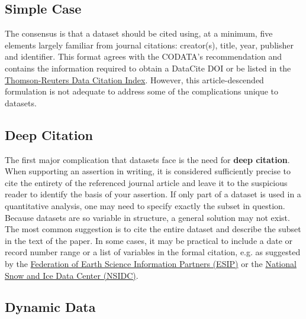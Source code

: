 \documentclass[10pt,twocolumn]{article}
\begin{document}
\subsection*{Simple Case}\label{simple-case}

The consensus is that a dataset should be cited using, at a minimum, five elements largely familiar from journal citations: creator(s), title, year, publisher and identifier.
This format agrees with the CODATA's recommendation\cite{codata-icsti_task_group_on_data_citation_standards_and_practices_out_2013} and contains the information required to obtain a DataCite DOI\cite{datacite_datacite_2013} or be listed in the \href{http://thomsonreuters.com/data-citation-index/}{Thomson-Reuters Data Citation Index}.
However, this article-descended formulation is not adequate to address some of the complications unique to datasets.

\subsection*{Deep Citation}\label{deep-citation}

The first major complication that datasets face is the need for \textbf{deep citation}.
When supporting an assertion in writing, it is considered sufficiently precise to cite the entirety of the referenced journal article and leave it to the suspicious reader to identify the basis of your assertion.
If only part of a dataset is used in a quantitative analysis, one may need to specify exactly the subset in question.
Because datasets are so variable in structure, a general solution may not exist.
The most common suggestion is to cite the entire dataset and describe the subset in the text of the paper.\cite{altman_a_2007,}
In some cases, it may be practical to include a date or record number range or a list of variables in the formal citation, e.g. as suggested by the  \href{http://wiki.esipfed.org/index.php/Interagency_Data_Stewardship/Citations/provider_guidelines#Subset_Used}{Federation of Earth Science Information Partners (ESIP)} or the \href{http://nsidc.org/about/use_copyright.html}{National Snow and Ice Data Center (NSIDC)}.

\subsection*{Dynamic Data}\label{dynamic-data}
\end{document}
